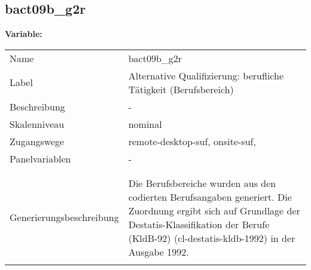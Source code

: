 	
	
	\subsection{bact09b\_g2r}
	\label{subSection:bact09b_g2r}

	\noindent\textbf{Variable:}\\
		\begin{tabular}{lL{11.3cm}}
			\label{tableVariable:bact09b_g2r}
			Name & bact09b\_g2r \\
			Label & Alternative Qualifizierung: berufliche Tätigkeit (Berufsbereich) \\
			Beschreibung & - \\
			Skalenniveau & nominal \\
			Zugangswege &
				remote-desktop-suf,
				onsite-suf,
 \\
			Panelvariablen & -
			 \\
			 \\
 \\
					Generierungsbeschreibung & Die Berufsbereiche wurden aus den codierten Berufsangaben generiert. Die Zuordnung ergibt sich auf Grundlage der Destatis-Klassifikation der Berufe (KldB-92) (cl-destatis-kldb-1992) in der Ausgabe 1992. 
				 \\	
			 \\
		\end{tabular}






